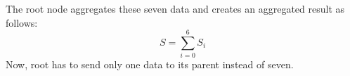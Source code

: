 \documentclass[%
  slidesonly,%
  semlayer%
  ]{seminar}                                  %
\begin{document}
\begin{slide}
    The root node aggregates these seven data and creates an aggregated result as follows:
    \begin{equation}
      S = \sum_{i=0}^6 S_{i}
    \end{equation}
    Now, root has to send only one data to its parent instead of seven.
      \clearpage



        






\end{slide}
\end{document}
